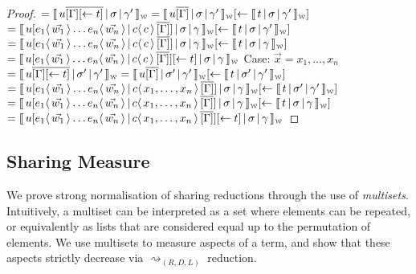 \documentclass[a4paper,UKenglish,cleveref, autoref]{lipics-v2019}
\newcommand{\share}[3]{#1 [#2 \leftarrow #3]}
\newcommand{\dist}[5]{#1 [ #2 \, \vert \, \fakedist{#4}{#5} \, #3 ]}
\newcommand{\fakedist}[2]{#1 \langle \, #2 \, \rangle}
\newcommand{\weaksymbol}{\mbox{\tiny $\mathcal{W}$}}
\newcommand{\readweakwmap}[3]{\llbracket \, #1 \, \vert \, #2 \, \vert \, #3  \, \rrbracket_{\weaksymbol} }
\begin{document}
\begin{proof}
\newline
$= \readweakwmap{u \overline{[\Gamma] \share{}{}{t}}}{\sigma}{\gamma'} = \readweakwmap{u \overline{[\Gamma]}}{\sigma}{\gamma'} \share{}{}{\readweakwmap{t}{\sigma}{\gamma'}}$
\newline
$= \readweakwmap{\dist{u}{\fakedist{e_{1}}{\vec{w_{1}}} \dots \fakedist{e_{n}}{\vec{w_{n}}}}{\overline{[\Gamma]}}{c}{c}}{\sigma}{\gamma} \share{}{}{\readweakwmap{t}{\sigma}{\gamma'}}$
\newline
$= \readweakwmap{\dist{u}{\fakedist{e_{1}}{\vec{w_{1}}} \dots \fakedist{e_{n}}{\vec{w_{n}}}}{\overline{[\Gamma]}}{c}{c}}{\sigma}{\gamma} \share{}{}{\readweakwmap{t}{\sigma}{\gamma}}$
\newline
$= \readweakwmap{\dist{u}{\fakedist{e_{1}}{\vec{w_{1}}} \dots \fakedist{e_{n}}{\vec{w_{n}}}}{\overline{[\Gamma]}}{c}{c} \share{}{}{t}}{\sigma}{\gamma}$
\newline
\newline
\indent Case: $\vec{x} = x_{1}, \dots, x_{n}$
\newline
$= \readweakwmap{u \overline{[\Gamma] \share{}{}{t}}}{\sigma'}{\gamma'} = \readweakwmap{u \overline{[\Gamma]}}{\sigma'}{\gamma'} \share{}{}{\readweakwmap{t}{\sigma'}{\gamma'}}$
\newline
$= \readweakwmap{\dist{u}{\fakedist{e_{1}}{\vec{w_{1}}} \dots \fakedist{e_{n}}{\vec{w_{n}}}}{\overline{[\Gamma]}}{c}{x_{1}, \dots, x_{n}}}{\sigma}{\gamma} \share{}{}{\readweakwmap{t}{\sigma'}{\gamma'}}$
\newline
$= \readweakwmap{\dist{u}{\fakedist{e_{1}}{\vec{w_{1}}} \dots \fakedist{e_{n}}{\vec{w_{n}}}}{\overline{[\Gamma]}}{c}{x_{1}, \dots, x_{n}}}{\sigma}{\gamma} \share{}{}{\readweakwmap{t}{\sigma}{\gamma}}$
\newline
$= \readweakwmap{\dist{u}{\fakedist{e_{1}}{\vec{w_{1}}} \dots \fakedist{e_{n}}{\vec{w_{n}}}}{\overline{[\Gamma]}}{c}{x_{1}, \dots, x_{n}} \share{}{}{t}}{\sigma}{\gamma}$
\end{proof}

\subsection{Sharing Measure}

We prove strong normalisation of sharing reductions through the use of \emph{multisets}. Intuitively, a multiset can be interpreted as a set where elements can be repeated, or equivalently as lists that are considered equal up to the permutation of elements. We use multisets to measure aspects of a term, and show that these aspects strictly decrease via $\rightsquigarrow_{(R, D, L)}$ reduction.
\end{document}

